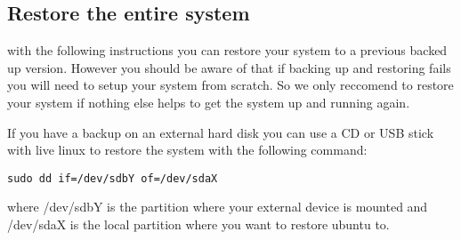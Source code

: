 \subsection{Restore the entire system}
with the following instructions you can restore your system to a previous backed up version. However you should be aware of that if backing up and restoring fails you will need to setup your system from scratch. So we only reccomend to restore your system if nothing else helps to get the system up and running again. 

If you have a backup on an external hard disk you can use a CD or USB stick with live linux to restore the system with the following command:
\begin{lstlisting}
sudo dd if=/dev/sdbY of=/dev/sdaX
\end{lstlisting}
where /dev/sdbY is the partition where your external device is mounted and /dev/sdaX is the local partition where you want to restore ubuntu to.


